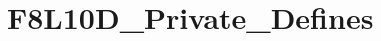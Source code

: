 \hypertarget{group___f8_l10_d___private___defines}{}\section{F8\+L10\+D\+\_\+\+Private\+\_\+\+Defines}
\label{group___f8_l10_d___private___defines}

